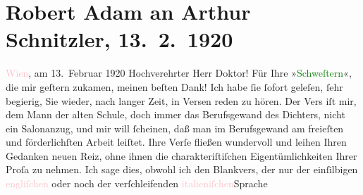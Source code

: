 

               \section[Robert Adam an Arthur Schnitzler, 13. 2. 1920]{ Robert Adam an Arthur Schnitzler, 13. 2. 1920}\nopagebreak{}\rehead{ }\normalsize\beginnumbering{} \toendnotes[C]{\smallbreak\pagebreak[2]} 
\toendnotes[C]{\smallbreak}\pstart
           \raggedleft{}{\pb}\textcolor{pink}{Wien}{}\ledrightnote{\textcolor{pink}{Wien}}, am 13. Februar 1920\pend
           \pstart\center{}Hochverehrter Herr Doktor!\pend\pstart
           Für Ihre »\textcolor{green}{Schweſtern}{}\ledrightnote{\textcolor{green}{Die Schwestern oder Casanova in Spa. Lustspiel in Versen}}«, die mir geſtern zukamen,
                    meinen beſten Dank! Ich habe ſie ſofort geleſen, ſehr begierig, Sie wieder, nach
                    langer Zeit, in Versen reden zu hören. Der Vers iſt mir, dem Mann der alten
                    Schule, doch immer das Berufsgewand des Dichters, nicht ein Salonanzug, und mir
                    will ſcheinen, daß man im Berufsgewand am freieſten und förderlichſten Arbeit
                    leiſtet. Ihre Verſe fließen wundervoll und leihen Ihren Gedanken neuen Reiz,
                    ohne ihnen die charakteriſtiſchen Eigentümlichkeiten Ihrer Proſa zu nehmen. Ich
                    sage dies, obwohl ich den Blankvers, der nur der einſilbigen \textcolor{pink}{engliſchen}{}\ledrightnote{\textcolor{pink}{England}} oder noch der verſchleifenden \textcolor{pink}{italieniſchen}{}\ledrightnote{\textcolor{pink}{Italien}}{ }Sprache
